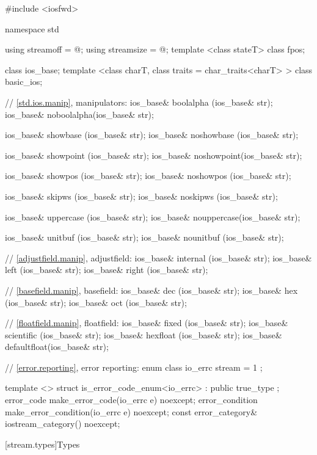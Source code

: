 \begin{codeblock}
#include <iosfwd>

namespace std {
  using streamoff  = @\impdef@;
  using streamsize = @\impdef@;
  template <class stateT> class fpos;

  class ios_base;
  template <class charT, class traits = char_traits<charT> >
    class basic_ios;

  // \ref{std.ios.manip}, manipulators:
  ios_base& boolalpha  (ios_base& str);
  ios_base& noboolalpha(ios_base& str);

  ios_base& showbase   (ios_base& str);
  ios_base& noshowbase (ios_base& str);

  ios_base& showpoint  (ios_base& str);
  ios_base& noshowpoint(ios_base& str);

  ios_base& showpos    (ios_base& str);
  ios_base& noshowpos  (ios_base& str);

  ios_base& skipws     (ios_base& str);
  ios_base& noskipws   (ios_base& str);

  ios_base& uppercase  (ios_base& str);
  ios_base& nouppercase(ios_base& str);

  ios_base& unitbuf    (ios_base& str);
  ios_base& nounitbuf  (ios_base& str);

  // \ref{adjustfield.manip}, adjustfield:
  ios_base& internal   (ios_base& str);
  ios_base& left       (ios_base& str);
  ios_base& right      (ios_base& str);

  // \ref{basefield.manip}, basefield:
  ios_base& dec        (ios_base& str);
  ios_base& hex        (ios_base& str);
  ios_base& oct        (ios_base& str);

  // \ref{floatfield.manip}, floatfield:
  ios_base& fixed      (ios_base& str);
  ios_base& scientific (ios_base& str);
  ios_base& hexfloat   (ios_base& str);
  ios_base& defaultfloat(ios_base& str);

  // \ref{error.reporting}, error reporting:
  enum class io_errc {
    stream = 1
  };

  template <> struct is_error_code_enum<io_errc> : public true_type { };
  error_code make_error_code(io_errc e) noexcept;
  error_condition make_error_condition(io_errc e) noexcept;
  const error_category& iostream_category() noexcept;
}
\end{codeblock}
%
%
%
%
%

[stream.types]{Types}


